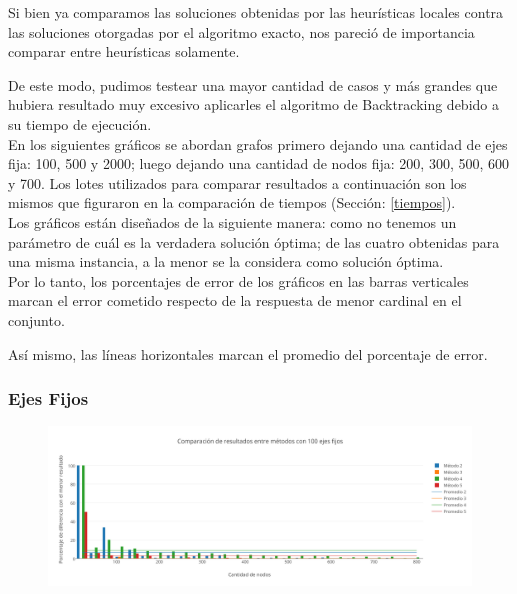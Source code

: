 Si bien ya comparamos las soluciones obtenidas por las heurísticas locales contra las soluciones otorgadas por el algoritmo exacto, nos pareció de importancia comparar entre heurísticas solamente.

De este modo, pudimos testear una mayor cantidad de casos y más grandes que hubiera resultado muy excesivo aplicarles el algoritmo de Backtracking debido a su tiempo de ejecución.\\

En los siguientes gráficos se abordan grafos primero dejando una cantidad de ejes fija: 100, 500 y 2000; luego dejando una cantidad de nodos fija: 200, 300, 500, 600 y 700. Los lotes utilizados para comparar resultados a continuación son los mismos que figuraron en la comparación de tiempos (Sección: \ref{tiempos}).\\

Los gráficos están diseñados de la siguiente manera: como no tenemos un parámetro de cuál es la verdadera solución óptima; de las cuatro obtenidas para una misma instancia, a la menor se la considera como solución óptima.\\

Por lo tanto, los porcentajes de error de los gráficos en las barras verticales marcan el error cometido respecto de la respuesta de menor cardinal en el conjunto.

Así mismo, las líneas horizontales marcan el promedio del porcentaje de error. 

\subsubsection*{Ejes Fijos}


  \begin{figure}[h!]
   \begin{center}
 	\includegraphics[scale=0.55]{imagenes/local/resultados/100ejes.png}
   \end{center}
 \end{figure}
 

